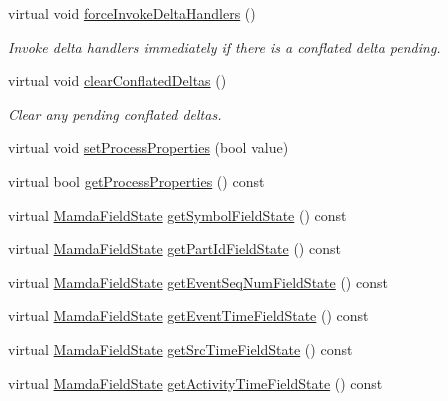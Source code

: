\begin{CompactItemize}
virtual void \hyperlink{classMamdaQuoteToBookListener_a87a519f30dd56c678cc0a847e090d26}{force\-Invoke\-Delta\-Handlers} ()
\begin{CompactList}\small\item\em Invoke delta handlers immediately if there is a conflated delta pending. \item\end{CompactList}\item 
virtual void \hyperlink{classMamdaQuoteToBookListener_ea724b9d69c544572dcfab7c8c002d18}{clear\-Conflated\-Deltas} ()
\begin{CompactList}\small\item\em Clear any pending conflated deltas. \item\end{CompactList}\item 
virtual void \hyperlink{classMamdaQuoteToBookListener_39b9f957b27047f5e15fdddaca242b91}{set\-Process\-Properties} (bool value)
\item 
virtual bool \hyperlink{classMamdaQuoteToBookListener_bdb5217044b44ba5fbe07ad75721743a}{get\-Process\-Properties} () const 
\item 
virtual \hyperlink{namespaceWombat_93aac974f2ab713554fd12a1fa3b7d2a}{Mamda\-Field\-State} \hyperlink{classMamdaQuoteToBookListener_6be1e25a1f340cf0142816c7cdb3d593}{get\-Symbol\-Field\-State} () const 
\item 
virtual \hyperlink{namespaceWombat_93aac974f2ab713554fd12a1fa3b7d2a}{Mamda\-Field\-State} \hyperlink{classMamdaQuoteToBookListener_7c760a83b876e17c52537cbd885697d5}{get\-Part\-Id\-Field\-State} () const 
\item 
virtual \hyperlink{namespaceWombat_93aac974f2ab713554fd12a1fa3b7d2a}{Mamda\-Field\-State} \hyperlink{classMamdaQuoteToBookListener_fea891c59bf8468fd07df1730f95399b}{get\-Event\-Seq\-Num\-Field\-State} () const 
\item 
virtual \hyperlink{namespaceWombat_93aac974f2ab713554fd12a1fa3b7d2a}{Mamda\-Field\-State} \hyperlink{classMamdaQuoteToBookListener_25e9bef42468b7b169032cb6e2c330c8}{get\-Event\-Time\-Field\-State} () const 
\item 
virtual \hyperlink{namespaceWombat_93aac974f2ab713554fd12a1fa3b7d2a}{Mamda\-Field\-State} \hyperlink{classMamdaQuoteToBookListener_681cac13c95fbc304bc6a9432e3319fe}{get\-Src\-Time\-Field\-State} () const 
\item 
virtual \hyperlink{namespaceWombat_93aac974f2ab713554fd12a1fa3b7d2a}{Mamda\-Field\-State} \hyperlink{classMamdaQuoteToBookListener_86342ed1f23500e6dbdbee055cb06886}{get\-Activity\-Time\-Field\-State} () const 

\end{CompactItemize}
